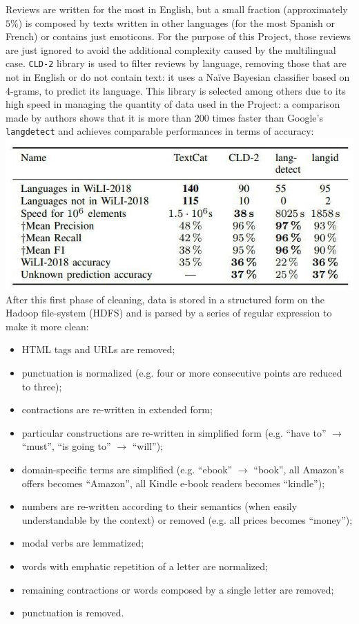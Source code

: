 \documentclass[fleqn,10pt]{SelfArx}
\begin{document}
Reviews are written for the most in English, but a small fraction (approximately $5\%$) is composed by texts written in other languages (for the most Spanish or French) or contains just emoticons.
For the purpose of this Project, those reviews are just ignored to avoid the additional complexity caused by the multilingual case.
\verb|CLD-2|\cite{cld2} library is used to filter reviews by language, removing those that are not in English or do not contain text: it uses a Naïve Bayesian classifier based on 4-grams, to predict its language.
This library is selected among others due to its high speed in managing the quantity of data used in the Project: a comparison made by authors shows that it is more than 200 times faster than Google's \verb|langdetect| and achieves comparable performances in terms of accuracy\cite[6]{cld2}: \newline
\includegraphics[width=\linewidth]{languages}
\newline
After this first phase of cleaning, data is stored in a structured form on the Hadoop file-system (HDFS) and is parsed by a series of regular expression to make it more clean:
\begin{itemize}[noitemsep]
    \item HTML tags and URLs are removed;
    \item punctuation is normalized (e.g. four or more consecutive points are reduced to three);
    \item contractions are re-written in extended form;
    \item particular constructions are re-written in simplified form (e.g. ``have to'' $\rightarrow$ ``must'', ``is going to'' $\rightarrow$ ``will'');
    \item domain-specific terms are simplified (e.g. ``ebook'' $\rightarrow$ ``book'', all Amazon's offers becomes ``Amazon'', all Kindle e-book readers becomes ``kindle'');
    \item numbers are re-written according to their semantics (when easily understandable by the context) or removed (e.g. all prices becomes ``money'');
    \item modal verbs are lemmatized;
    \item words with emphatic repetition of a letter are normalized;
    \item remaining contractions or words composed by a single letter are removed;
    \item punctuation is removed.
\end{itemize}
\end{document}
